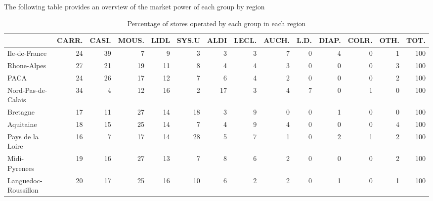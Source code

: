 \documentclass[11pt]{article}
\begin{document}
The following table provides an overview of the market power of each group by region

\begin{table}[H]
\caption{Percentage of stores operated by each group in each region}
\footnotesize
\setlength{\tabcolsep}{2pt}

\begin{tabular}{lrrrrrrrrrrrrr}
\toprule
{} &      CARR. &      CASI. &      MOUS. &       LIDL &      SYS.U &       ALDI &      LECL. &      AUCH. &       L.D. &      DIAP. &      COLR. &       OTH. &       TOT. \\
\midrule
Ile-de-France        &         24 &         39 &          7 &          9 &          3 &          3 &          3 &          7 &          0 &          4 &          0 &          1 &        100 \\
Rhone-Alpes          &         27 &         21 &         19 &         11 &          8 &          4 &          4 &          3 &          0 &          0 &          0 &          3 &        100 \\
PACA                 &         24 &         26 &         17 &         12 &          7 &          6 &          4 &          2 &          0 &          0 &          0 &          2 &        100 \\
Nord-Pas-de-Calais   &         34 &          4 &         12 &         16 &          2 &         17 &          3 &          4 &          7 &          0 &          1 &          0 &        100 \\
Bretagne             &         17 &         11 &         27 &         14 &         18 &          3 &          9 &          0 &          0 &          1 &          0 &          0 &        100 \\
Aquitaine            &         18 &         15 &         25 &         14 &          7 &          4 &          9 &          4 &          0 &          0 &          0 &          4 &        100 \\
Pays de la Loire     &         16 &          7 &         17 &         14 &         28 &          5 &          7 &          1 &          0 &          2 &          1 &          2 &        100 \\
Midi-Pyrenees        &         19 &         16 &         27 &         13 &          7 &          8 &          6 &          2 &          0 &          0 &          0 &          2 &        100 \\
Languedoc-Roussillon &         20 &         17 &         25 &         16 &         10 &          6 &          2 &          2 &          0 &          1 &          0 &          1 &        100 \\

\end{tabular}
\end{table}
\end{document}
